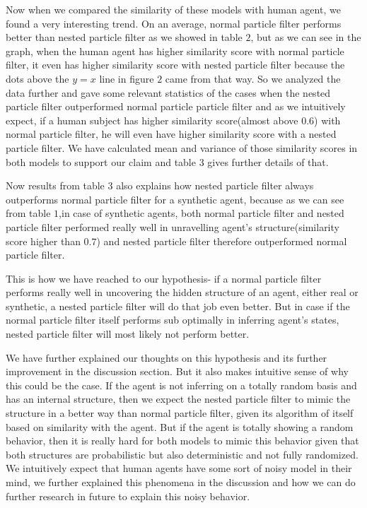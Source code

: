 \documentclass[12pt,letterpaper]{article}
\begin{document}
Now when we compared the similarity of these models with human agent, we found a very interesting trend. On an average, normal particle filter performs better than nested particle filter as we showed in table $2$, but as we can see in the graph, when the human agent has higher similarity score with normal particle filter, it even has higher similarity score with nested particle filter because the dots above the $y=x$ line in figure $2$ came from that way. So we analyzed the data further and gave some relevant statistics of the cases when the nested particle filter outperformed normal particle particle filter and as we intuitively expect, if a human subject has higher similarity score(almost above $0.6$) with normal particle filter, he will even have higher similarity score with a nested particle filter. We have calculated mean and variance of those similarity scores in both models  to support our claim and table $3$ gives further details of that.

Now results from table 3 also explains how nested particle filter always outperforms normal particle filter for a synthetic agent, because as we can see from table $1$,in case of synthetic agents, both normal particle filter and nested particle filter performed really well in unravelling agent's structure(similarity score higher than $0.7$) and nested particle filter therefore outperformed normal particle filter.

This is how we have reached to our hypothesis- if a normal particle filter performs really well in uncovering the hidden structure of an agent, either real or synthetic, a nested particle filter will do that job even better. But in case if the normal particle filter itself performs sub optimally in inferring agent's states, nested particle filter will most likely not perform better.

We have further explained our thoughts on this hypothesis and its further improvement in the discussion section. But it also makes intuitive sense of why this could be the case. If the agent is not inferring on a totally random basis and has an internal structure, then we expect the nested particle filter to mimic the structure in a better way than normal particle filter, given its algorithm of itself based on similarity with the agent. But if the agent is totally showing a random behavior, then it is really hard for both models to mimic this behavior given that both structures are probabilistic but also deterministic and not fully randomized. We intuitively expect that human agents have some sort of noisy model in their mind, we further explained this phenomena in the discussion and how we can do further research in future to explain this noisy behavior.
\end{document}
